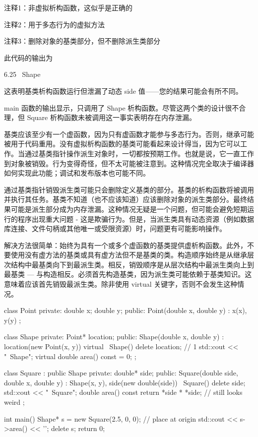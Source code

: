 {\footnotesize
注释1：非虚拟析构函数，这似乎是正确的

注释2：用于多态行为的虚拟方法

注释3：删除对象的基类部分，但不删除派生类部分
}

此代码的输出为

\begin{shell}
6.25
~Shape
\end{shell}

这表明基类析构函数运行但泄漏了动态 side 值——您的结果可能会有所不同。


main 函数的输出显示，只调用了 Shape 析构函数。尽管这两个类的设计很不合理，但 Square 析构函数未被调用这一事实表明存在内存泄漏。

基类应该至少有一个虚函数，因为只有虚函数才能参与多态行为。否则，继承可能被用于代码重用。没有虚拟析构函数的基类可能看起来设计得当，因为它可以工作。当通过基类指针操作派生对象时，一切都按预期工作。也就是说，它一直工作到对象被销毁。行为变得奇怪，但不太可能被注意到。这种情况完全取决于编译器如何实现此功能；调试和发布版本也可能不同。

通过基类指针销毁派生类可能只会删除定义基类的部分。基类的析构函数将被调用并执行其任务。基类不知道（也不应该知道）应该删除对象的派生类部分。最终结果可能是派生部分成为内存泄漏。这种情况无疑是一个问题，但可能会避免短期运行的程序出现重大问题 - 这是欺骗行为。但是，当派生类具有动态资源（例如数据库连接、文件句柄或其他唯一或受限资源）时，问题更有可能影响操作。


解决方法很简单：始终为具有一个或多个虚函数的基类提供虚析构函数。此外，不要使用没有虚方法的基类或具有虚方法但不是基类的类。构造顺序始终是从继承层次结构中最基类向下到最派生类。相反，销毁顺序是从层次结构中最派生类向上到最基类 — 与构造相反。必须首先构造基类，因为派生类可能依赖于基类知识。这意味着应该首先销毁最派生类。除非使用 virtual 关键字，否则不会发生这种情况。


\begin{cpp}
class Point {
private:
  double x;
  double y;
public:
  Point(double x, double y) : x(x), y(y) {}
};

class Shape {
private:
  Point* location;
public:
  Shape(double x, double y) : location(new Point(x, y)) {}
  virtual ~Shape() { delete location; // 1
  std::cout << "~Shape\n"; }
  virtual double area() const = 0;
};

class Square : public Shape {
private:
  double* side;
public:
  Square(double side, double x, double y) : Shape(x, y),
    side(new double(side)) {}
  ~Square() { delete side; std::cout << "~Square\n"; }
  double area() const { return *side * *side; } // still looks weird
};

int main() {
  Shape* s = new Square(2.5, 0, 0); // place at origin
  std::cout << s->area() << '\n';
  delete s;
  return 0;
}
\end{cpp}

